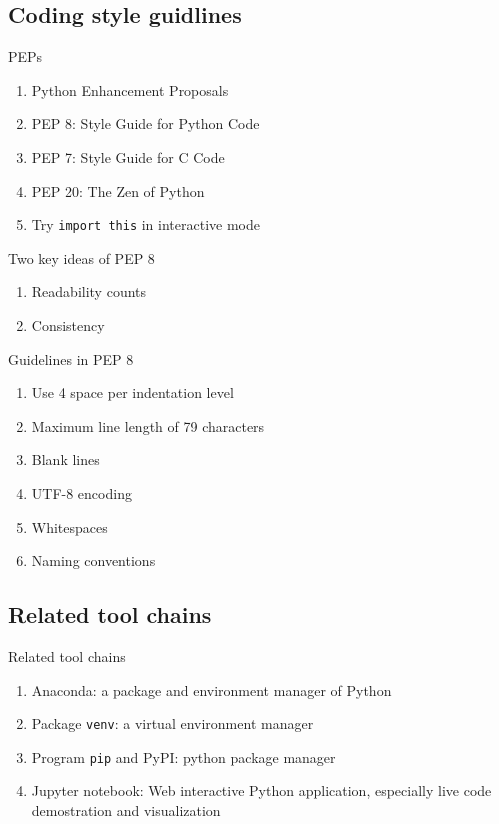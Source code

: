 \documentclass[english, nochinese]{pkuslide}
\begin{document}
\begin{frame}
\sectionpage
\end{frame}

\subsection{Coding style guidlines}

\begin{frame}[fragile]{PEPs}
\begin{enumerate}
\item Python Enhancement Proposals
\item PEP 8: Style Guide for Python Code
\item PEP 7: Style Guide for C Code
\item PEP 20: The Zen of Python
\item Try \verb"import this" in interactive mode
\end{enumerate}
\end{frame}

\begin{frame}{Two key ideas of PEP 8}
\begin{enumerate}
\item Readability counts
\item Consistency
\end{enumerate}
\end{frame}

\begin{frame}{Guidelines in PEP 8}
\begin{enumerate}
\item Use 4 space per indentation level
\item Maximum line length of 79 characters
\item Blank lines
\item UTF-8 encoding
\item Whitespaces
\item Naming conventions
\end{enumerate}
\end{frame}

\subsection{Related tool chains}

\begin{frame}[fragile]{Related tool chains}
\begin{enumerate}
\item Anaconda: a package and environment manager of Python
\item Package \verb"venv": a virtual environment manager
\item Program \texttt{pip} and PyPI: python package manager
\item Jupyter notebook: Web interactive Python application, especially live code demostration and visualization
\end{enumerate}
\end{frame}

	
\end{document}
